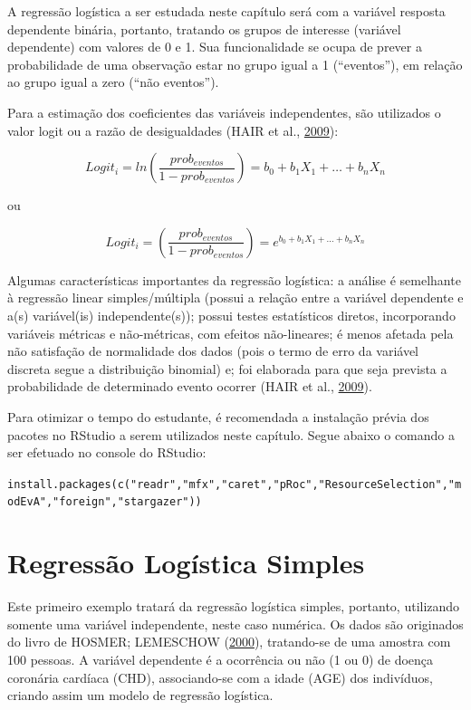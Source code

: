 \documentclass[12pt,brazil,]{book}
\begin{document}
A regressão logística a ser estudada neste capítulo será com a variável
resposta dependente binária, portanto, tratando os grupos de interesse
(variável dependente) com valores de 0 e 1. Sua funcionalidade se ocupa
de prever a probabilidade de uma observação estar no grupo igual a 1
(``eventos''), em relação ao grupo igual a zero (``não eventos'').

Para a estimação dos coeficientes das variáveis independentes, são
utilizados o valor logit ou a razão de desigualdades (HAIR et al.,
\protect\hyperlink{ref-Hair2009}{2009}):

\[
Logit_i=ln\left (\frac{prob_{eventos}}{1-prob_{eventos}}  \right )=b_0+b_1X_1+\ldots+b_nX_n
\]

ou

\[
Logit_i=\left (\frac{prob_{eventos}}{1-prob_{eventos}}  \right )=e^{b_0+b_1X_1+\ldots+b_nX_n}
\]

Algumas características importantes da regressão logística: a análise é
semelhante à regressão linear simples/múltipla (possui a relação entre a
variável dependente e a(s) variável(is) independente(s)); possui testes
estatísticos diretos, incorporando variáveis métricas e não-métricas,
com efeitos não-lineares; é menos afetada pela não satisfação de
normalidade dos dados (pois o termo de erro da variável discreta segue a
distribuição binomial) e; foi elaborada para que seja prevista a
probabilidade de determinado evento ocorrer (HAIR et al.,
\protect\hyperlink{ref-Hair2009}{2009}).

Para otimizar o tempo do estudante, é recomendada a instalação prévia
dos pacotes no RStudio a serem utilizados neste capítulo. Segue abaixo o
comando a ser efetuado no console do RStudio:

\texttt{install.packages(c("readr","mfx","caret","pRoc","ResourceSelection","modEvA","foreign","stargazer"))}

\hypertarget{regressao-logistica-simples}{%
\section{Regressão Logística
Simples}\label{regressao-logistica-simples}}

Este primeiro exemplo tratará da regressão logística simples, portanto,
utilizando somente uma variável independente, neste caso numérica. Os
dados são originados do livro de HOSMER; LEMESCHOW
(\protect\hyperlink{ref-Hosmer2000}{2000}), tratando-se de uma amostra
com 100 pessoas. A variável dependente é a ocorrência ou não (1 ou 0) de
doença coronária cardíaca (CHD), associando-se com a idade (AGE) dos
indivíduos, criando assim um modelo de regressão logística.
\end{document}
